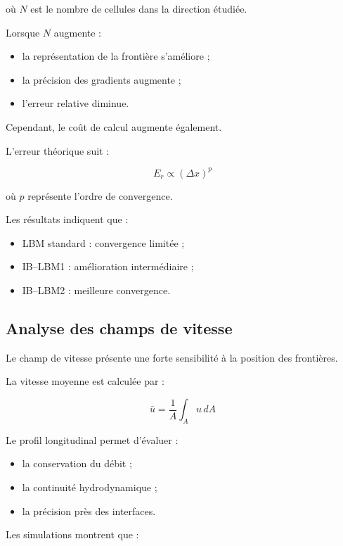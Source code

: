 \documentclass[12pt,a4paper]{report}
\begin{document}
où $N$ est le nombre de cellules dans la direction étudiée.

Lorsque $N$ augmente :

\begin{itemize}
\item la représentation de la frontière s’améliore ;
\item la précision des gradients augmente ;
\item l’erreur relative diminue.
\end{itemize}

Cependant, le coût de calcul augmente également.

L’erreur théorique suit :

\begin{equation}
E_r
\propto
(\Delta x)^p
\end{equation}

où $p$ représente l’ordre de convergence.

Les résultats indiquent que :

\begin{itemize}
\item LBM standard : convergence limitée ;
\item IB--LBM1 : amélioration intermédiaire ;
\item IB--LBM2 : meilleure convergence.
\end{itemize}

\subsection{Analyse des champs de vitesse}

Le champ de vitesse présente une forte sensibilité à la position des frontières.

La vitesse moyenne est calculée par :

\begin{equation}
\bar{u}
=
\frac{1}{A}
\int_A u \, dA
\end{equation}

Le profil longitudinal permet d’évaluer :

\begin{itemize}
\item la conservation du débit ;
\item la continuité hydrodynamique ;
\item la précision près des interfaces.
\end{itemize}

Les simulations montrent que :
\end{document}
